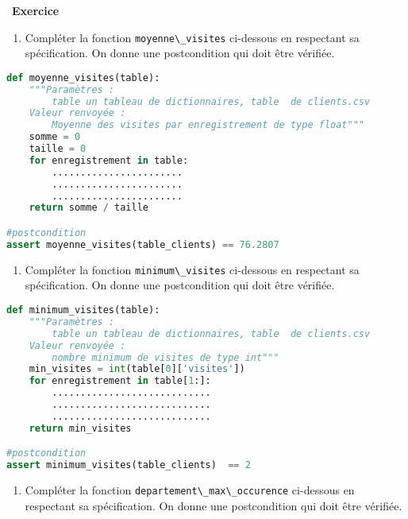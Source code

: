 \documentclass[
  11pt,
]{article}
\newcommand{\passthrough}[1]{#1}
\providecommand{\tightlist}{%
  \setlength{\itemsep}{0pt}\setlength{\parskip}{0pt}}
\newcounter{exo}
\newenvironment{exercice}[1]
{\par \medskip   \addtocounter{exo}{1} \noindent  
\begin{bclogo}[arrondi =0.1,   noborder = true, logo=\bccrayon, marge=4]{~\textbf{Exercice} \textbf{\theexo} {\itshape #1} }  \par}
{
\end{bclogo}
 \par \bigskip }
\newcounter{def}
\begin{document}
\begin{exercice}{}
\begin{enumerate}
\def\labelenumi{\arabic{enumi}.}
\setcounter{enumi}{2}
\tightlist
\item
  Compléter la fonction \passthrough{\lstinline!moyenne\_visites!}
  ci-dessous en respectant sa spécification. On donne une postcondition
  qui doit être vérifiée.
\end{enumerate}

\begin{lstlisting}[language=Python]
def moyenne_visites(table):
    """Paramètres : 
        table un tableau de dictionnaires, table  de clients.csv
    Valeur renvoyée :
        Moyenne des visites par enregistrement de type float"""
    somme = 0
    taille = 0
    for enregistrement in table:
        .......................
        .......................
        .......................
    return somme / taille

#postcondition
assert moyenne_visites(table_clients) == 76.2807 
\end{lstlisting}

\begin{enumerate}
\def\labelenumi{\arabic{enumi}.}
\setcounter{enumi}{3}
\tightlist
\item
  Compléter la fonction \passthrough{\lstinline!minimum\_visites!}
  ci-dessous en respectant sa spécification. On donne une postcondition
  qui doit être vérifiée.
\end{enumerate}

\begin{lstlisting}[language=Python]
def minimum_visites(table):
    """Paramètres : 
        table un tableau de dictionnaires, table  de clients.csv
    Valeur renvoyée :
        nombre minimum de visites de type int"""    
    min_visites = int(table[0]['visites'])
    for enregistrement in table[1:]:
        ............................
        ............................
        ............................
    return min_visites

#postcondition
assert minimum_visites(table_clients)  == 2
\end{lstlisting}

\begin{enumerate}
\def\labelenumi{\arabic{enumi}.}
\setcounter{enumi}{4}
\tightlist
\item
  Compléter la fonction
  \passthrough{\lstinline!departement\_max\_occurence!} ci-dessous en
  respectant sa spécification. On donne une postcondition qui doit être
  vérifiée.
\end{enumerate}


\end{exercice}
\end{document}
